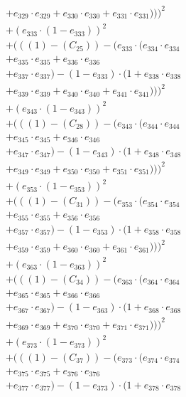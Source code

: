 \documentclass[10pt, a4paper]{article}
\begin{document}
\begin{small}
\begin{align*}
& + e_{329} \cdot e_{329} + e_{330} \cdot e_{330} + e_{331} \cdot e_{331})))^{2} \\
& + (e_{333} \cdot (1 - e_{333}))^{2} \\
& + (((1) - (C_{25})) - (e_{333} \cdot (e_{334} \cdot e_{334} \\
& + e_{335} \cdot e_{335} + e_{336} \cdot e_{336} \\
& + e_{337} \cdot e_{337}) - (1 - e_{333}) \cdot (1 + e_{338} \cdot e_{338} \\
& + e_{339} \cdot e_{339} + e_{340} \cdot e_{340} + e_{341} \cdot e_{341})))^{2} \\
& + (e_{343} \cdot (1 - e_{343}))^{2} \\
& + (((1) - (C_{28})) - (e_{343} \cdot (e_{344} \cdot e_{344} \\
& + e_{345} \cdot e_{345} + e_{346} \cdot e_{346} \\
& + e_{347} \cdot e_{347}) - (1 - e_{343}) \cdot (1 + e_{348} \cdot e_{348} \\
& + e_{349} \cdot e_{349} + e_{350} \cdot e_{350} + e_{351} \cdot e_{351})))^{2} \\
& + (e_{353} \cdot (1 - e_{353}))^{2} \\
& + (((1) - (C_{31})) - (e_{353} \cdot (e_{354} \cdot e_{354} \\
& + e_{355} \cdot e_{355} + e_{356} \cdot e_{356} \\
& + e_{357} \cdot e_{357}) - (1 - e_{353}) \cdot (1 + e_{358} \cdot e_{358} \\
& + e_{359} \cdot e_{359} + e_{360} \cdot e_{360} + e_{361} \cdot e_{361})))^{2} \\
& + (e_{363} \cdot (1 - e_{363}))^{2} \\
& + (((1) - (C_{34})) - (e_{363} \cdot (e_{364} \cdot e_{364} \\
& + e_{365} \cdot e_{365} + e_{366} \cdot e_{366} \\
& + e_{367} \cdot e_{367}) - (1 - e_{363}) \cdot (1 + e_{368} \cdot e_{368} \\
& + e_{369} \cdot e_{369} + e_{370} \cdot e_{370} + e_{371} \cdot e_{371})))^{2} \\
& + (e_{373} \cdot (1 - e_{373}))^{2} \\
& + (((1) - (C_{37})) - (e_{373} \cdot (e_{374} \cdot e_{374} \\
& + e_{375} \cdot e_{375} + e_{376} \cdot e_{376} \\
& + e_{377} \cdot e_{377}) - (1 - e_{373}) \cdot (1 + e_{378} \cdot e_{378} \\

\end{align*}
\end{small}
\end{document}
